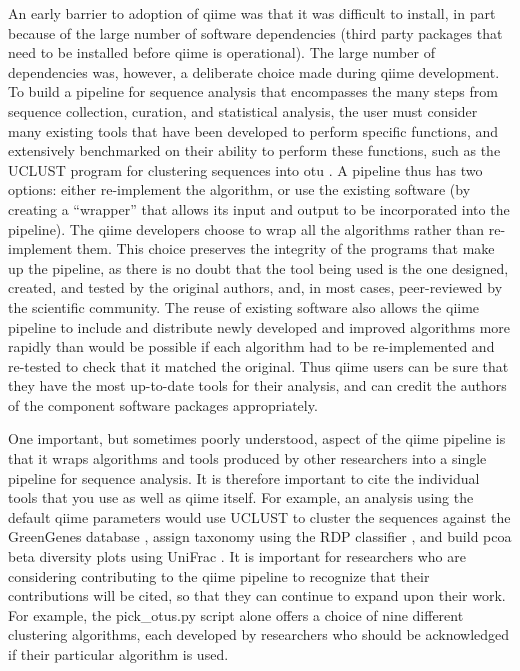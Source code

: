 An early barrier to adoption of \gls{qiime} was that it was difficult to install,
in part because of the large number of software dependencies (third party packages
that need to be installed before \gls{qiime} is operational). The large number of
dependencies was, however, a deliberate choice made during \gls{qiime} development.
To build a pipeline for sequence analysis that encompasses the many steps from sequence
collection, curation, and statistical analysis, the user must consider many existing
tools that have been developed to perform specific functions, and extensively benchmarked
on their ability to perform these functions, such as the UCLUST program for clustering
sequences into \gls{otu} \cite{Edgar2010}. A pipeline thus has two options: either
re-implement the algorithm, or use the existing software (by creating a “wrapper”
that allows its input and output to be incorporated into the pipeline). The \gls{qiime}
developers choose to wrap all the algorithms rather than re-implement them. This choice
preserves the integrity of the programs that make up the pipeline, as there is no doubt
that the tool being used is the one designed, created, and tested by the original authors,
and, in most cases, peer-reviewed by the scientific community. The reuse of existing
software also allows the \gls{qiime} pipeline to include and distribute newly developed
and improved algorithms more rapidly than would be possible if each algorithm had to be
re-implemented and re-tested to check that it matched the original. Thus \gls{qiime} users
can be sure that they have the most up-to-date tools for their analysis, and can credit the
authors of the component software packages appropriately.

One important, but sometimes poorly understood, aspect of the \gls{qiime} pipeline is that
it wraps algorithms and tools produced by other researchers into a single pipeline for
sequence analysis. It is therefore important to cite the individual tools that you use as well
as \gls{qiime} itself. For example, an analysis using the default \gls{qiime} parameters \cite{Caporaso2010}
would use UCLUST \cite{Edgar2010} to cluster the sequences against the GreenGenes
database \cite{DeSantis2006}, assign taxonomy using the RDP classifier \cite{Wang2007}, and
build \gls{pcoa} beta diversity plots using UniFrac \cite{Lozupone2005}. It is important for
researchers who are considering contributing to the \gls{qiime} pipeline to recognize
that their contributions will be cited, so that they can continue to expand upon their work.
For example, the pick\_otus.py script alone offers a choice of nine different clustering algorithms,
each developed by researchers who should be acknowledged if their particular algorithm is used.


